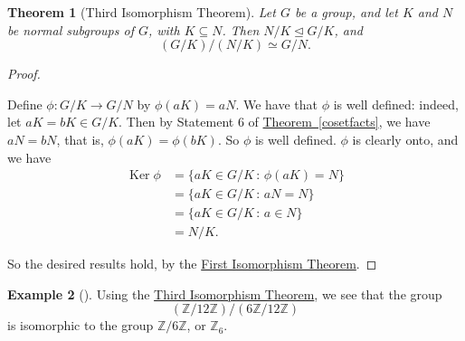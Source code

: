 \documentclass[10pt,openany,oneside]{book}
\theoremstyle{plain}
\newtheorem{theorem}{Theorem}[section]
\theoremstyle{definition}
\theoremstyle{definition}
\theoremstyle{definition}
\newtheorem{example}[theorem]{Example}
\theoremstyle{definition}
\numberwithin{equation}{section}
\def\Z{\mathbb{Z}}
\DeclareMathOperator{\Ker}{Ker}
\newcommand{\amp}{&}
\begin{document}
\begin{theorem}[{Third Isomorphism Theorem}]\label{tit}
Let \(G\) be a group, and let \(K\) and \(N\) be normal subgroups of \(G\), with \(K\subseteq N\). Then \(N/K \unlhd G/K\), and%
\begin{equation*}
(G/K)/(N/K)\simeq G/N.
\end{equation*}
%
\end{theorem}
\begin{proof}\hypertarget{proof-54}{}
Define \(\phi: G/K\to G/N\) by \(\phi(aK)=aN\). We have that \(\phi\) is well defined: indeed, let \(aK=bK \in G/K\). Then by Statement 6 of \hyperref[cosetfacts]{Theorem~\ref{cosetfacts}}, we have \(aN=bN\), that is, \(\phi(aK)=\phi(bK)\). So \(\phi\) is well defined. \(\phi\) is clearly onto, and we have%
\begin{align*}
\Ker \phi\amp =\{aK\in
G/K\,:\,\phi(aK)=N\}\\
\amp =\{aK\in G/K\,:\,aN=N\}\\
\amp =\{aK\in
G/K\,:\,a\in N\}\\
\amp =N/K.
\end{align*}
%
\par
So the desired results hold, by the \hyperref[fit]{First Isomorphism Theorem}.%
\end{proof}
\begin{example}[]\label{example-86}
Using the \hyperref[tit]{Third Isomorphism Theorem}, we see that the group%
\begin{equation*}
(\Z/12\Z)/(6\Z/12\Z)
\end{equation*}
is isomorphic to the group \(\Z/6\Z\), or \(\Z_6\).%
\end{example}
\typeout{************************************************}
\typeout{************************************************}
\end{document}
